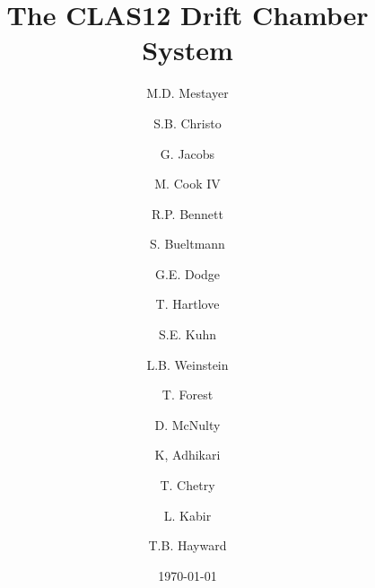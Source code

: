\documentclass{elsart}
\begin{document}
\begin{frontmatter}
  
\title{The CLAS12 Drift Chamber System}


\author[jlab]{M.D. Mestayer}
\author[jlab]{S.B. Christo}
\author[jlab]{G. Jacobs}
\author[jlab]{M. Cook IV}
\author[odu]{R.P. Bennett}
\author[odu]{S. Bueltmann}
\author[odu]{G.E. Dodge}
\author[odu]{T. Hartlove}
\author[odu]{S.E. Kuhn}
\author[odu]{L.B. Weinstein}
\author[isu]{T. Forest}
\author[isu]{D. McNulty}
\author[msu]{K, Adhikari}
\author[msu]{T. Chetry}
\author[msu]{L. Kabir}
\author[wm]{T.B. Hayward}
\address[jlab]{Thomas Jefferson National Accelerator Facility, Newport News, VA 23606, USA}
\address[odu]{Old Dominion University}
\address[isu]{Idaho State University}
\address[msu]{Mississippi State University}
\address[wm]{University of William and Mary}

\date{\today}





\end{frontmatter}
















\end{document}
